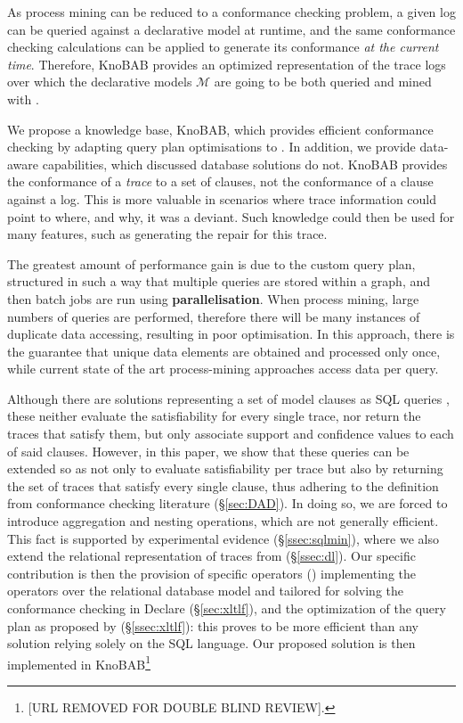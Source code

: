 As process mining can be reduced to a conformance checking problem, a given log can be queried against a declarative model at runtime, and the same conformance checking calculations can be applied to generate its conformance \emph{at the current time}. Therefore, KnoBAB provides an optimized representation of the trace logs over which the declarative models $\mathcal{M}$ are going to be both queried and mined with \LTLf.

We propose a knowledge base, KnoBAB, which provides efficient conformance checking by adapting query plan optimisations \cite{BellatrecheKB21} to \LTLf. In addition, we provide data-aware capabilities, which discussed database solutions do not. KnoBAB provides the conformance of a \emph{trace} to a set of clauses, not the conformance of a clause against a log. This is more valuable in scenarios where trace information could point to where, and why, it was a deviant. Such knowledge could then be used for many features, such as generating the repair for this trace.
\medskip


The greatest amount of performance gain is due to the custom query plan, structured in such a way that multiple queries are stored within a graph, and then batch jobs are run using \textbf{parallelisation}. When process mining, large numbers of queries are performed, therefore there will be many instances of duplicate data accessing, resulting in poor optimisation. In this approach, there is the guarantee that unique data elements are obtained and processed only once, while current state of the art process-mining approaches access data per query. 
\fi

Although there are solutions representing a set of model clauses as SQL queries \cite{Schonig15,SchonigRCJM16}, these neither evaluate the satisfiability for every single trace, nor return the traces that satisfy them, but only associate support and confidence values to each of said clauses. However, in this paper, we show that these queries can be extended so as not only to evaluate satisfiability per trace but also by returning the set of traces that satisfy every single clause, thus adhering to the definition from conformance checking literature (\S\ref{sec:DAD}). In doing so,  we are forced to introduce  aggregation and nesting operations, which are not generally efficient. This fact is supported by experimental evidence (\S\ref{ssec:sqlmin}), where we also extend the relational representation of traces from \cite{Schonig15,SchonigRCJM16} (\S\ref{ssec:dl}). Our specific contribution is then the provision of specific operators (\xLTLf) implementing the \LTLf operators over the relational database model and tailored for solving the conformance checking in Declare (\S\ref{sec:xltlf}), and the optimization of the query plan as proposed by \cite{BellatrecheKB21} (\S\ref{ssec:xltlf}): this proves to be more efficient than any solution relying solely on the SQL language. Our proposed solution is then implemented in KnoBAB\footnote{[URL REMOVED FOR DOUBLE BLIND REVIEW].}

